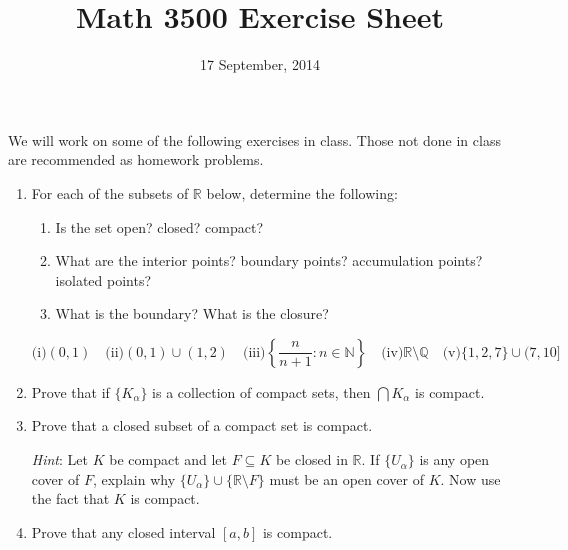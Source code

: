 \documentclass[letterpaper,12pt]{article}
\title{Math 3500 Exercise Sheet}
\date{17 September, 2014}
\newcommand{\N}{\mathbb{N}}
\newcommand{\Q}{\mathbb{Q}}
\newcommand{\R}{\mathbb{R}}
\begin{document}
\maketitle

We will work on some of the following exercises in class. Those not done in class are recommended as homework problems.
\begin{enumerate}
 \item For each of the subsets of $\R$ below, determine the following:
 \begin{enumerate}
  \item Is the set open? closed? compact?
  \item What are the interior points? boundary points? accumulation points? isolated points?
  \item What is the boundary? What is the closure?
 \end{enumerate}
\[
\text{(i)} (0,1)\quad \text{(ii)} (0,1)\cup (1,2) \quad \text{(iii)} \left\{\frac{n}{n+1} : n\in\N\right\}\quad \text{(iv)} \R\setminus \Q \quad \text{(v)} \{1,2,7\}\cup(7,10]
\]
\item Prove that if $\{K_\alpha\}$ is a collection of compact sets, then $\bigcap K_\alpha$ is compact.
\item Prove that a closed subset of a compact set is compact.

{\em Hint}: Let $K$ be compact and let $F\subseteq K$ be closed in $\R$. If $\{U_\alpha\}$ is any open cover of $F$, explain why $\{U_\alpha\}\cup\{\R\setminus F\}$ must be an open cover of $K$. Now use the fact that $K$ is compact.

\item Prove that any closed interval $[a,b]$ is compact.


\end{enumerate}
\end{document}
